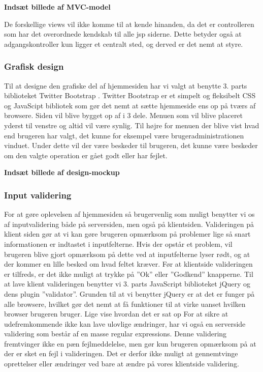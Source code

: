 \documentclass[a4paper]{article}
\begin{document}
\begin{center}
  \textbf{Indsæt billede af MVC-model}
\end{center}

De forskellige views vil ikke komme til at kende hinanden, da det er controlleren som har det overordnede kendskab til alle jsp siderne. Dette betyder også at adgangskontroller kun ligger et centralt sted, og derved er det nemt at styre.

\subsubsection{Grafisk design} %

Til at designe den grafiske del af hjemmesiden har vi valgt at benytte 3. parts biblioteket Twitter Bootstrap .  Twitter Bootstrap er et simpelt og fleksibelt CSS og JavaScipt bibliotek som gør det nemt at sætte hjemmeside ens op på tværs af browsere. Siden vil blive bygget op af i 3 dele. Menuen som vil blive placeret yderst til venstre og altid vil være synlig. Til højre for menuen der blive vist hvad end brugeren har valgt, det kunne for eksempel være brugeradministrationen vinduet. Under dette vil der være beskeder til brugeren, det kunne være beskeder om den valgte operation er gået godt eller har fejlet.

\begin{center}
  \textbf{Indsæt billede af design-mockup}
\end{center}


\subsubsection{Input validering} %

For at gøre oplevelsen af hjemmesiden så brugervenlig som muligt benytter vi os af inputvalidering både på serversiden, men også på klientsiden. Valideringen på klient siden gør at vi kan gøre brugeren opmærksom på problemer lige så snart informationen er indtastet i inputfelterne. Hvis der opstår et problem, vil brugeren blive gjort opmærksom på dette ved at inputfelterne lyser rødt, og at der kommer en lille besked om hvad feltet kræver.  Før at klientside valideringen er tilfreds, er det ikke muligt at trykke på ”Ok” eller ”Godkend” knapperne.  
Til at lave klient valideringen benytter vi 3. parts JavaScript biblioteket  jQuery  og dens plugin ”validator”. Grunden til at vi benytter jQuery er at det er funger på alle browsere, hvilket gør det nemt at få funktioner til at virke uanset hvilken browser brugeren bruger. 
Lige vise hvordan det er sat op
For at sikre at udefremkommende ikke kan lave ulovlige ændringer, har vi også en serverside validering som består af en masse regular expressions. Denne validering fremtvinger ikke en pæn fejlmeddelelse, men gør kun brugeren opmærksom på at der er sket en fejl i valideringen. Det er derfor ikke muligt at gennemtvinge oprettelser eller ændringer ved bare at ændre på vores klientside validering. 
\end{document}
